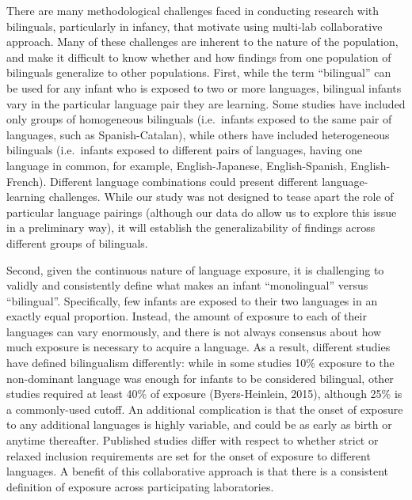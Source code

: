 \documentclass[,man,floatsintext]{apa6}
\begin{document}
There are many methodological challenges faced in conducting research with bilinguals, particularly in infancy, that motivate using multi-lab collaborative approach. Many of these challenges are inherent to the nature of the population, and make it difficult to know whether and how findings from one population of bilinguals generalize to other populations. First, while the term \enquote{bilingual} can be used for any infant who is exposed to two or more languages, bilingual infants vary in the particular language pair they are learning. Some studies have included only groups of homogeneous bilinguals (i.e.~infants exposed to the same pair of languages, such as Spanish-Catalan), while others have included heterogeneous bilinguals (i.e.~infants exposed to different pairs of languages, having one language in common, for example, English-Japanese, English-Spanish, English-French). Different language combinations could present different language-learning challenges. While our study was not designed to tease apart the role of particular language pairings (although our data do allow us to explore this issue in a preliminary way), it will establish the generalizability of findings across different groups of bilinguals.

Second, given the continuous nature of language exposure, it is challenging to validly and consistently define what makes an infant \enquote{monolingual} versus \enquote{bilingual}. Specifically, few infants are exposed to their two languages in an exactly equal proportion. Instead, the amount of exposure to each of their languages can vary enormously, and there is not always consensus about how much exposure is necessary to acquire a language. As a result, different studies have defined bilingualism differently: while in some studies 10\% exposure to the non-dominant language was enough for infants to be considered bilingual, other studies required at least 40\% of exposure (Byers-Heinlein, 2015), although 25\% is a commonly-used cutoff. An additional complication is that the onset of exposure to any additional languages is highly variable, and could be as early as birth or anytime thereafter. Published studies differ with respect to whether strict or relaxed inclusion requirements are set for the onset of exposure to different languages. A benefit of this collaborative approach is that there is a consistent definition of exposure across participating laboratories.
\end{document}

